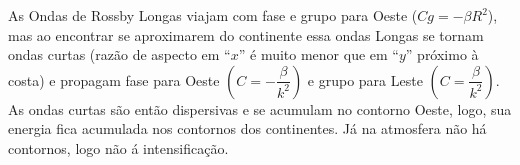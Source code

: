 \documentclass[letterpaper,portuguese,12pt,pdftex]{exam}
\begin{document}
\begin{questions}
\begin{parts}
\begin{solution}
As Ondas de Rossby Longas viajam com fase e grupo para Oeste ($Cg = -\beta R^2$),
mas ao encontrar se aproximarem do continente essa ondas Longas se tornam ondas
curtas (razão de aspecto em ``$x$'' é muito menor que em ``$y$'' próximo à
costa) e propagam fase para Oeste $\left( C = -\dfrac{\beta}{k^2} \right)$ e
grupo para Leste $\left( C = \dfrac{\beta}{k^2} \right)$.   As ondas curtas são
então dispersivas e se acumulam no contorno Oeste, logo, sua energia fica
acumulada nos contornos dos continentes.  Já na atmosfera não há contornos, logo
não á intensificação.
\end{solution}

\end{parts}

\end{questions}
\end{document}
